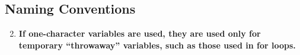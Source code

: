 \documentclass[a4paper,11pt]{report} %
\begin{document}
		\subsection*{Naming Conventions}\begin{enumerate}[resume]
			\setcounter{enumi}{1}	
			\item \textbf{If one-character variables are used, they are used only for temporary ``throwaway'' variables, such as those used in for loops.}\smallskip \\
%				
			\setcounter{enumi}{7}
		\end{enumerate}
		
\end{document}
